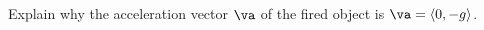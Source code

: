 \begin{activity} \label{A:9.7.8} Explain why the acceleration vector $\va$ of the fired object is $\va = \langle 0, -g \rangle$.



\begin{comment}

As stated, there is no external force acting to move the object in the $x$ direction, so the $x$ component of the acceleration vector is 0. Since gravity acts to pull the object down, the $y$ component of the acceleration is $-g$. So
\[\va(t) = \langle 0, -g \rangle.\]

\end{comment}


\end{activity}
\begin{smallhint}

\end{smallhint}
\begin{bighint}

\end{bighint}
\begin{activitySolution}

\end{activitySolution}
\aftera
